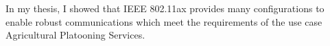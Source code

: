 In my thesis, I showed that IEEE 802.11ax provides many configurations to enable robust communications which meet the requirements of the use case Agricultural Platooning Services.



\begin{comment}
    Untersuchen, welche Routing protocols
    Wi-Fi offers a wide range of physical layer configurations, which can be used to reduce the data rate and enable robust communication.

    Future work could investigate whether modern Wi-Fi can be used for other \ac{WIC} use cases.
    IEEE 802.11bd is a new standard, which is designed for \ac{WIC} in the industrial domain.


    Guten Tag Herr Professor Sommer,

Anbei finden Sie die aktuelle Version meiner Diplomarbeit, welche nun auch die Feldversuche enthält. Wenn Sie noch nicht auf die Diplomarbeit schauen konnten oder noch vor Kapitel 4 Field Measurements sind, können Sie gerne auf die aktuelle Version im Anhang wechseln.

Die PDF musste ich komprimieren, weil sie sonst zu groß war. Wenn Sie eine unkomprimierte Version lieber wollen, kann ich ihnen gerne einen Zugang zum Git-Repro geben.

Vielen Dank,

Karl Lautenschläger
\end{comment}